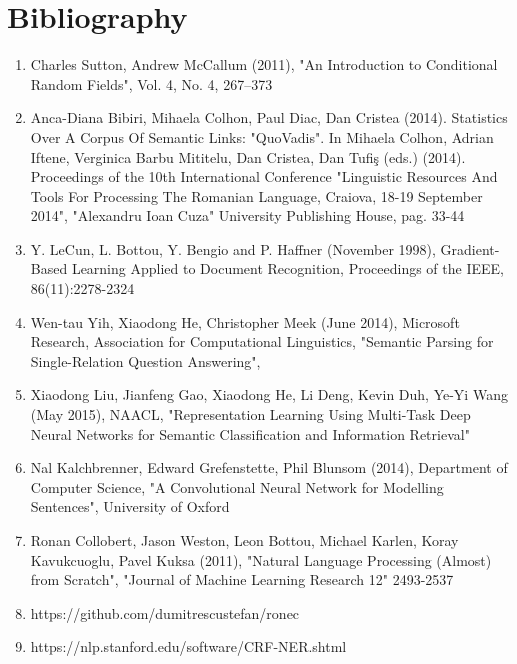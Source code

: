 \documentclass[12pt,a4paper]{article}
\begin{document}
\section{Bibliography}
\begin {center}

\begin{enumerate}
\item Charles Sutton, Andrew McCallum (2011), "An Introduction to Conditional Random Fields", Vol. 4, No. 4, 267–373

\item Anca-Diana Bibiri, Mihaela Colhon, Paul Diac, Dan Cristea (2014). Statistics Over A Corpus Of Semantic Links: "QuoVadis". In Mihaela Colhon, Adrian Iftene, Verginica Barbu Mititelu, Dan Cristea, Dan Tufiş (eds.) (2014). Proceedings of the 10th International Conference "Linguistic Resources And Tools For Processing The Romanian Language, Craiova, 18-19 September 2014", "Alexandru Ioan Cuza" University Publishing House, pag. 33-44

\item Y. LeCun, L. Bottou, Y. Bengio and P. Haffner (November 1998), Gradient-Based Learning Applied to Document Recognition, Proceedings of the IEEE, 86(11):2278-2324

\item Wen-tau Yih, Xiaodong He, Christopher Meek (June 2014), Microsoft Research, Association for Computational Linguistics, "Semantic Parsing for Single-Relation Question Answering", 

\item Xiaodong Liu, Jianfeng Gao, Xiaodong He, Li Deng, Kevin Duh, Ye-Yi Wang (May 2015), NAACL, "Representation Learning Using Multi-Task Deep Neural Networks for Semantic Classification and Information Retrieval"

\item Nal Kalchbrenner, Edward Grefenstette, Phil Blunsom (2014), Department of Computer Science, "A Convolutional Neural Network for Modelling Sentences", University of Oxford

\item Ronan Collobert, Jason Weston, Leon Bottou, Michael Karlen, Koray Kavukcuoglu, Pavel Kuksa (2011), "Natural Language Processing (Almost) from Scratch", "Journal of Machine Learning Research 12"  2493-2537

\item https://github.com/dumitrescustefan/ronec

\item https://nlp.stanford.edu/software/CRF-NER.shtml


\end{enumerate}
\end{center}
\end{document}
